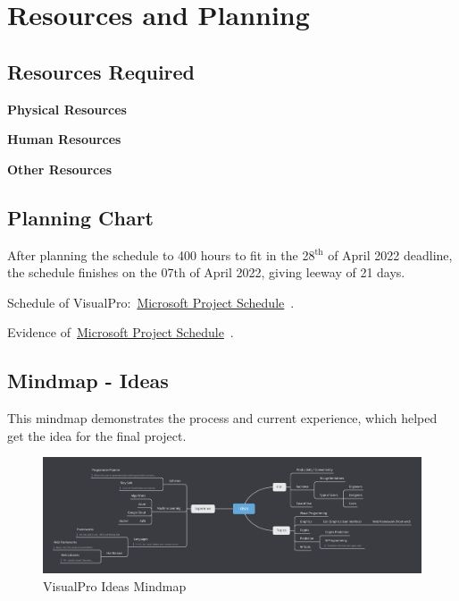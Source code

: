 \documentclass[conference]{IEEEtran}
\begin{document}
    \section{Resources and Planning}
    \label{sec: resourcesPlanning}
      \subsection{Resources Required}
        \textbf{Physical Resources}

        \textbf{Human Resources}

        \textbf{Other Resources}

      \subsection{Planning Chart}
      \label{subsec:rp-planningChart}
        After planning the schedule to 400 hours to fit in the 28$^{\text{th}}$ of April 2022 deadline, the schedule finishes on the 07${\text{th}}$ of April 2022, giving leeway of 21 days. 

        Schedule of VisualPro:~\href{https://github.com/ShinkuKira21/VisualPro-FinalProject/blob/main/Project/VisualPro.mpp?raw=true}{Microsoft Project Schedule}~\cite{patch_visualpro_2021}.
        
        Evidence of~\href{https://github.com/ShinkuKira21/VisualPro-FinalProject/blob/main/Project/Plan.docx?raw=true}{Microsoft Project Schedule}~\cite{patch_visualpro_2021-1}.

      \begin{landscape}
        \thispagestyle{fancylandscape}
        \subsection{Mindmap - Ideas}
        This mindmap demonstrates the process and current experience, which helped get the idea for the final project.
        \begin{figure}[h]
          \includegraphics[height=.83\textheight, width=1.30\textwidth]{Figures/mindmap-ideas.png}
          \caption{VisualPro Ideas Mindmap}
        \end{figure}
      \end{landscape}
\end{document}
